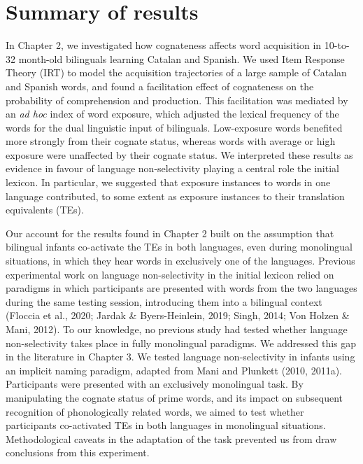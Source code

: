\documentclass[
  12pt,
  b5paperpaper,
  twoside]{scrreprt}
\begin{document}
\hypertarget{summary-of-results}{%
\section{Summary of results}\label{summary-of-results}}

In Chapter 2, we investigated how cognateness affects word acquisition
in 10-to-32 month-old bilinguals learning Catalan and Spanish. We used
Item Response Theory (IRT) to model the acquisition trajectories of a
large sample of Catalan and Spanish words, and found a facilitation
effect of cognateness on the probability of comprehension and
production. This facilitation was mediated by an \emph{ad hoc} index of
word exposure, which adjusted the lexical frequency of the words for the
dual linguistic input of bilinguals. Low-exposure words benefited more
strongly from their cognate status, whereas words with average or high
exposure were unaffected by their cognate status. We interpreted these
results as evidence in favour of language non-selectivity playing a
central role the initial lexicon. In particular, we suggested that
exposure instances to words in one language contributed, to some extent
as exposure instances to their translation equivalents (TEs).

Our account for the results found in Chapter 2 built on the assumption
that bilingual infants co-activate the TEs in both languages, even
during monolingual situations, in which they hear words in exclusively
one of the languages. Previous experimental work on language
non-selectivity in the initial lexicon relied on paradigms in which
participants are presented with words from the two languages during the
same testing session, introducing them into a bilingual context (Floccia
et al., 2020; Jardak \& Byers-Heinlein, 2019; Singh, 2014; Von Holzen \&
Mani, 2012). To our knowledge, no previous study had tested whether
language non-selectivity takes place in fully monolingual paradigms. We
addressed this gap in the literature in Chapter 3. We tested language
non-selectivity in infants using an implicit naming paradigm, adapted
from Mani and Plunkett (2010, 2011a). Participants were presented with
an exclusively monolingual task. By manipulating the cognate status of
prime words, and its impact on subsequent recognition of phonologically
related words, we aimed to test whether participants co-activated TEs in
both languages in monolingual situations. Methodological caveats in the
adaptation of the task prevented us from draw conclusions from this
experiment.
\end{document}
